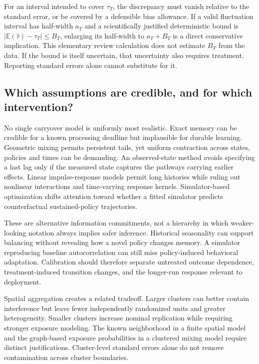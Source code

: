 \documentclass[12pt]{article}
\begin{document}
For an interval intended to cover $\tau_T$, the discrepancy must vanish relative to the standard error, or be covered by a defensible bias allowance. If a valid fluctuation interval has half-width $a_T$ and a scientifically justified deterministic bound is $|\mathbb{E}(\widehat\tau)-\tau_T|\leq B_T$, enlarging its half-width to $a_T+B_T$ is a direct conservative implication. This elementary review calculation does not estimate $B_T$ from the data. If the bound is itself uncertain, that uncertainty also requires treatment. Reporting standard errors alone cannot substitute for it.

\subsection{Which assumptions are credible, and for which intervention?}

No single carryover model is uniformly most realistic. Exact memory can be credible for a known processing deadline but implausible for durable learning. Geometric mixing permits persistent tails, yet uniform contraction across states, policies and times can be demanding. An observed-state method avoids specifying a last lag only if the measured state captures the pathways carrying earlier effects. Linear impulse-response models permit long histories while ruling out nonlinear interactions and time-varying response kernels. Simulator-based optimization shifts attention toward whether a fitted simulator predicts counterfactual sustained-policy trajectories.

These are alternative information commitments, not a hierarchy in which weaker-looking notation always implies safer inference. Historical seasonality can support balancing without revealing how a novel policy changes memory. A simulator reproducing baseline autocorrelation can still miss policy-induced behavioral adaptation. Calibration should therefore separate untreated outcome dependence, treatment-induced transition changes, and the longer-run response relevant to deployment.

Spatial aggregation creates a related tradeoff. Larger clusters can better contain interference but leave fewer independently randomized units and greater heterogeneity. Smaller clusters increase nominal replication while requiring stronger exposure modeling. The known neighborhood in a finite spatial model and the graph-based exposure probabilities in a clustered mixing model require distinct justifications. Cluster-level standard errors alone do not remove contamination across cluster boundaries.
\end{document}

